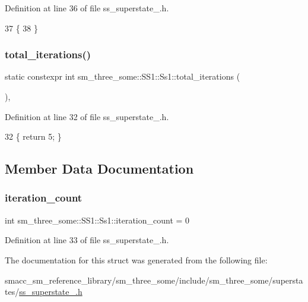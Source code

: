 Definition at line 36 of file ss\+\_\+superstate\+\_.\+h.


\begin{DoxyCode}
37     \{
38     \}
\end{DoxyCode}
\mbox{\label{structsm__three__some_1_1SS1_1_1Ss1_a02f44c29d4ebf2615b66a0783ee668e4}} 
\subsubsection{\texorpdfstring{total\+\_\+iterations()}{total\_iterations()}}
{\footnotesize\ttfamily static constexpr int sm\+\_\+three\+\_\+some\+::\+S\+S1\+::\+Ss1\+::total\+\_\+iterations (\begin{DoxyParamCaption}{ }\end{DoxyParamCaption})\hspace{0.3cm}{\ttfamily [inline]}, {\ttfamily [static]}}



Definition at line 32 of file ss\+\_\+superstate\+\_.\+h.


\begin{DoxyCode}
32 \{ \textcolor{keywordflow}{return} 5; \}
\end{DoxyCode}


\subsection{Member Data Documentation}
\mbox{\label{structsm__three__some_1_1SS1_1_1Ss1_a775d2050e53513d711b041238b5c11ff}} 
\subsubsection{\texorpdfstring{iteration\+\_\+count}{iteration\_count}}
{\footnotesize\ttfamily int sm\+\_\+three\+\_\+some\+::\+S\+S1\+::\+Ss1\+::iteration\+\_\+count = 0}



Definition at line 33 of file ss\+\_\+superstate\+\_.\+h.



The documentation for this struct was generated from the following file\+:\begin{DoxyCompactItemize}
\item 
smacc\+\_\+sm\+\_\+reference\+\_\+library/sm\+\_\+three\+\_\+some/include/sm\+\_\+three\+\_\+some/superstates/\hyperlink{ss__superstate__1_8h}{ss\+\_\+superstate\+\_.\+h}\end{DoxyCompactItemize}
